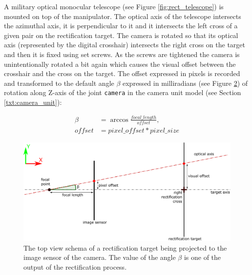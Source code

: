 \begin{figure}[htb]
\begin{minipage}{.59\textwidth}
		\label{fig:rect_azi_axis}
	\end{minipage}
\end{figure}

A military optical monocular telescope (see Figure \ref{fig:rect_telescope}) is mounted on top of the manipulator. The optical axis of the telescope intersects the azimuthal axis, it is perpendicular to it and it intersects the left cross of a given pair on the rectification target. The camera is rotated so that its optical axis (represented by the digital crosshair) intersects the right cross on the target and then it is fixed using set screws. As the screws are tightened the camera is unintentionally rotated a bit again which causes the visual offset between the crosshair and the cross on the target. The offset expressed in pixels is recorded and transformed to the default angle $\beta$ expressed in milliradians (see Figure \ref{fig:rect_pixel_offset}) of rotation along Z-axis of the joint \texttt{camera} in the camera unit model (see Section \ref{txt:camera_unit}):

\begin{equation*}
	\begin{aligned}
		\beta &= \arccos\frac{focal\_length}{offset}, \\
		offset &= pixel\_offset * pixel\_size
	\end{aligned}
\end{equation*}

\begin{figure}[htb]
	\centering
	\includegraphics[width=13cm]{fig/rect_pixel_offset.pdf}
	\caption{The top view schema of a rectification target being projected to the image sensor of the camera. The value of the angle $\beta$ is one of the output of the rectification process.}
	\label{fig:rect_pixel_offset}
\end{figure}


